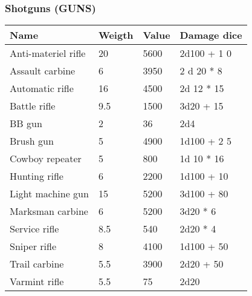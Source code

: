 
\subsubsection{Shotguns (GUNS)}
\begin{longtable}{|p{4cm}|p{1.5cm}|p{1.5cm}|p{9cm}|}
\hline
\bfseries Name & \bfseries Weigth & \bfseries Value & \bfseries Damage dice \\
\hline
Anti-materiel rifle & 20 & 5600 & 2d100 +  1 0 \\
Assault carbine & 6 & 3950 & 2 d 20  *  8 \\
Automatic rifle  & 16 & 4500 & 2d 12  *  15 \\
Battle rifle & 9.5  & 1500 & 3d20 + 15 \\
BB gun  & 2 & 36 & 2d4 \\
Brush gun  & 5 & 4900 & 1d100  +  2 5 \\
Cowboy repeater  & 5 & 800 & 1d 10  *  16 \\
Hunting rifle  & 6 & 2200 & 1d100 + 10 \\
Light machine gun  & 15 & 5200 & 3d100 + 80 \\
Marksman carbine  & 6 & 5200 & 3d20  *  6 \\
Service rifle  & 8.5  & 540 & 2d20  *  4 \\
Sniper rifle  & 8 & 4100 & 1d100 + 50 \\
Trail carbine  & 5.5  & 3900 & 2d20 + 50 \\
Varmint rifle  & 5.5  & 75 & 2d20 \\
\hline
\end{longtable}
